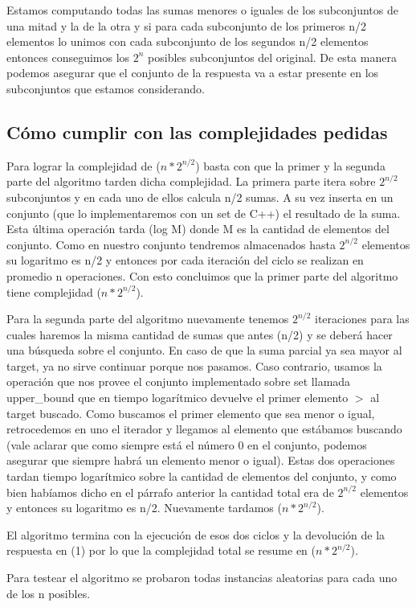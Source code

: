 Estamos computando todas las sumas menores o iguales de los subconjuntos de una mitad y la de la otra y si para cada subconjunto de los primeros n/2 elementos lo unimos con cada subconjunto de los segundos n/2 elementos entonces conseguimos los $2^{n}$ posibles subconjuntos del original. De esta manera podemos asegurar que el conjunto de la respuesta va a estar presente en los subconjuntos que estamos considerando.

\subsection{Cómo cumplir con las complejidades pedidas}

Para lograr la complejidad de \bigo($n * 2 ^{n/2}$) basta con que la primer y la segunda parte del algoritmo tarden dicha complejidad.
La primera parte itera sobre $2 ^{n/2}$ subconjuntos y en cada uno de ellos calcula n/2 sumas. A su vez inserta en un conjunto (que lo implementaremos con un set de C++) el resultado de la suma. Esta última operación tarda \bigo(log M) donde M es la cantidad de elementos del conjunto. Como en nuestro conjunto tendremos almacenados hasta $2 ^{n/2}$ elementos su logaritmo es n/2 y entonces por cada iteración del ciclo se realizan en promedio n operaciones.
Con esto concluimos que la primer parte del algoritmo tiene complejidad  \bigo($n * 2 ^{n/2}$).

Para la segunda parte del algoritmo nuevamente tenemos $2 ^{n/2}$ iteraciones para las cuales haremos la misma cantidad de sumas que antes (n/2) y se deberá hacer una búsqueda sobre el conjunto. En caso de que la suma parcial ya sea mayor al target, ya no sirve continuar porque nos pasamos. Caso contrario, usamos la operación que nos provee el conjunto implementado sobre set llamada upper_bound que en tiempo logarítmico devuelve el primer elemento $>$ al target buscado. Como buscamos el primer elemento que sea menor o igual, retrocedemos en uno el iterador y llegamos al elemento que estábamos buscando (vale aclarar que como siempre está el número 0 en el conjunto, podemos asegurar que siempre habrá un elemento menor o igual). Estas dos operaciones tardan tiempo logarítmico sobre la cantidad de elementos del conjunto, y como bien habíamos dicho en el párrafo anterior la cantidad total era de $2 ^{n/2}$ elementos y entonces su logaritmo es n/2. Nuevamente tardamos \bigo($n * 2 ^{n/2}$).

El algoritmo termina con la ejecución de esos dos ciclos y la devolución de la respuesta en \bigo(1) por lo que la complejidad total se resume en \bigo($n * 2 ^{n/2}$).

Para testear el algoritmo se probaron todas instancias aleatorias para cada uno de los n posibles.
